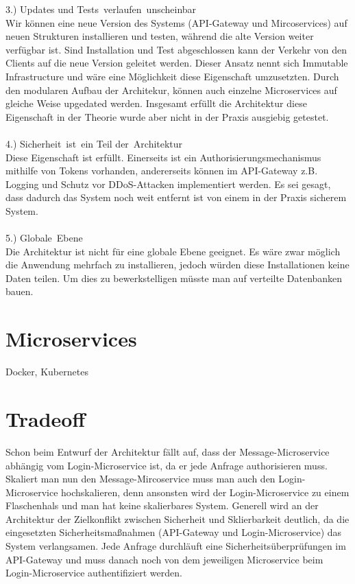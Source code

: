 3.) Updates und Tests verlaufen unscheinbar\\
Wir können eine neue Version des Systems (API-Gateway und Mircoservices) auf neuen Strukturen installieren und testen, während die alte Version weiter verfügbar ist. Sind Installation und Test abgeschlossen kann der Verkehr von den Clients auf die neue Version geleitet werden. Dieser Ansatz nennt sich Immutable Infrastructure und wäre eine Möglichkeit diese Eigenschaft umzusetzten. Durch den modularen Aufbau der Architekur, können auch einzelne Microservices auf gleiche Weise upgedated werden. Insgesamt erfüllt die Architektur diese Eigenschaft in der Theorie wurde aber nicht in der Praxis ausgiebig getestet.\\
\\
4.) Sicherheit ist ein Teil der Architektur\\
Diese Eigenschaft ist erfüllt. Einerseits ist ein Authorisierungsmechanismus mithilfe von Tokens vorhanden, andererseits können im API-Gateway z.B. Logging und Schutz vor DDoS-Attacken implementiert werden. Es sei gesagt, dass dadurch das System noch weit entfernt ist von einem in der Praxis sicherem System.\\
\\
5.) Globale Ebene\\
Die Architektur ist nicht für eine globale Ebene geeignet. Es wäre zwar möglich die Anwendung mehrfach zu installieren, jedoch würden diese Installationen keine Daten teilen. Um dies zu bewerkstelligen müsste man auf verteilte Datenbanken bauen.

\section{Microservices}
 Docker, Kubernetes
 
\section{Tradeoff}
\label{tradeoff}
Schon beim Entwurf der Architektur fällt auf, dass der Message-Microservice abhängig vom Login-Microservice ist, da er jede Anfrage authorisieren muss. Skaliert man nun den Message-Mircoservice muss man auch den Login-Microservice hochskalieren, denn ansonsten wird der Login-Microservice zu einem Flaschenhals und man hat keine skalierbares System. Generell wird an der Architektur der Zielkonflikt zwischen Sicherheit und Sklierbarkeit deutlich, da die eingesetzten Sicherheitsmaßnahmen (API-Gateway und Login-Microservice) das System verlangsamen. Jede Anfrage durchläuft eine Sicherheitsüberprüfungen im API-Gateway und muss danach noch von dem jeweiligen Microservice beim Login-Microservice authentifiziert werden.


